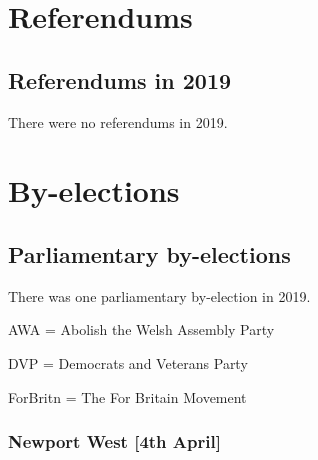 \documentclass[a4paper,openany]{book}
\begin{document}
 
 



\part{Referendums}

\chapter{Referendums in 2019}

There were no referendums in 2019.

%
%

\part{By-elections}

\chapter{Parliamentary by-elections}

There was one parliamentary by-election in 2019.

AWA = Abolish the Welsh Assembly Party

DVP = Democrats and Veterans Party

ForBritn = The For Britain Movement

\section*{Newport West \hspace*{\fill}\nolinebreak[1]%
\enspace\hspace*{\fill}
[4th April]}

\end{document}
